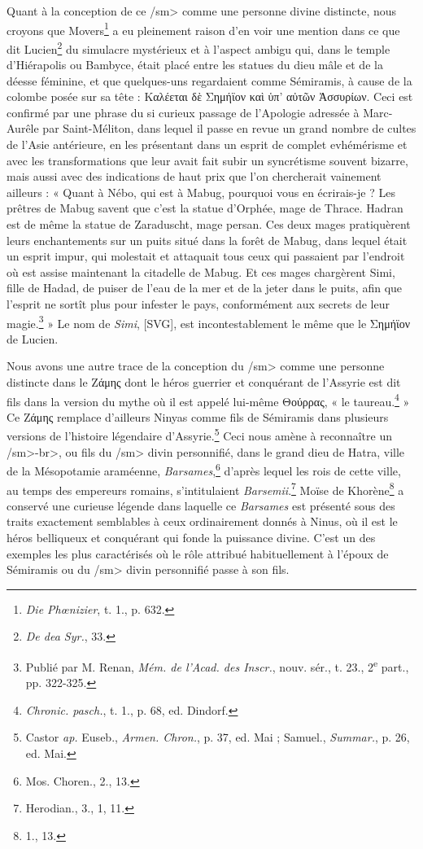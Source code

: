 \documentclass[a4paper, 11pt, oneside]{article}
\begin{document}
Quant à la conception de ce \</sm> comme une personne divine distincte, nous croyons que Movers\footnote{\emph{Die Phœnizier}, t. 1., p. 632.} a eu pleinement raison d'en voir une mention dans ce que dit Lucien\footnote{\emph{De dea Syr.}, 33.} du simulacre mystérieux et à l'aspect ambigu qui, dans le temple d'Hiérapolis ou Bambyce, était placé entre les statues du dieu mâle et de la déesse féminine, et que quelques-uns regardaient comme Sémiramis, à cause de la colombe posée sur sa tête : Καλέεται δὲ Σημήϊον καὶ ὑπ' αὐτῶν Ἀσσυρίων. Ceci est confirmé par une phrase du si curieux passage de l'Apologie adressée à Marc-Aurêle par Saint-Méliton, dans lequel il passe en revue un grand nombre de cultes de l'Asie antérieure, en les présentant dans un esprit de complet evhémérisme et avec les transformations que leur avait fait subir un syncrétisme souvent bizarre, mais aussi avec des indications de haut prix que l'on chercherait vainement ailleurs : « Quant à Nébo, qui est à Mabug, pourquoi vous en écrirais-je ? Les prêtres de Mabug savent que c'est la statue d'Orphée, mage de Thrace. Hadran est de même la statue de Zaraduscht, mage persan. Ces deux mages pratiquèrent leurs enchantements sur un puits situé dans la forêt de Mabug, dans lequel était un esprit impur, qui molestait et attaquait tous ceux qui passaient par l'endroit où est assise maintenant la citadelle de Mabug. Et ces mages chargèrent Simi, fille de Hadad, de puiser de l'eau de la mer et de la jeter dans le puits, afin que l'esprit ne sortît plus pour infester le pays, conformément aux secrets de leur magie.\footnote{Publié par M. Renan, \emph{Mém. de l'Acad. des Inscr.}, nouv. sér., t. 23., 2\textsuperscript{e} part., pp. 322-325.} » Le nom de \emph{Simi}, [SVG], est incontestablement le même que le Σημήϊον de Lucien.

Nous avons une autre trace de la conception du \</sm> comme une personne distincte dans le Ζάμης dont le héros guerrier et conquérant de l'Assyrie est dit fils dans la version du mythe où il est appelé lui-même Θούρρας, « le taureau.\footnote{\emph{Chronic. pasch.}, t. 1., p. 68, ed. Dindorf.} » Ce Ζάμης remplace d'ailleurs Ninyas comme fils de Sémiramis dans plusieurs versions de l'histoire légendaire d'Assyrie.\footnote{Castor \emph{ap.} Euseb., \emph{Armen. Chron.}, p. 37, ed. Mai ; Samuel., \emph{Summar.}, p. 26, ed. Mai.} Ceci nous amène à reconnaître un \</sm>-\<br>, ou fils du \</sm> divin personnifié, dans le grand dieu de Hatra, ville de la Mésopotamie araméenne, \emph{Barsames},\footnote{Mos. Choren., 2., 13.} d'après lequel les rois de cette ville, au temps des empereurs romains, s'intitulaient \emph{Barsemii}.\footnote{Herodian., 3., 1, 11.} Moïse de Khorène\footnote{1., 13.} a conservé une curieuse légende dans laquelle ce \emph{Barsames} est présenté sous des traits exactement semblables à ceux ordinairement donnés à Ninus, où il est le héros belliqueux et conquérant qui fonde la puissance divine. C'est un des exemples les plus caractérisés où le rôle attribué habituellement à l'époux de Sémiramis ou du \</sm> divin personnifié passe à son fils.
\end{document}
